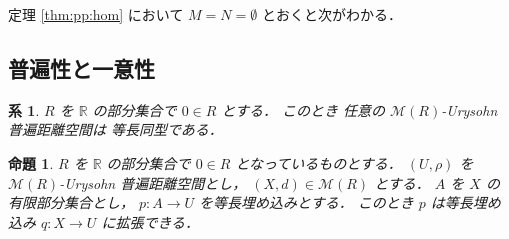 \documentclass[leqno, 12pt]{jsarticle}
\newtheorem{prop}[thm]{命題}
\newtheorem{cor}[thm]{系}
\newcommand{\rr}{\mathbb{R}}
\newcommand{\Met}[1]{\mathscr{M}(#1)}
\begin{document}
定理 \ref{thm:pp:hom}
において
$M=N=\emptyset$
とおくと次がわかる．
\subsection{普遍性と一意性}\label{subsec:uniqueness:universality}

\begin{cor}\label{cor:pp:doukeiury}
$R$
を
$\rr$
の部分集合で
$0\in R$
とする．%
このとき
任意の
$\Met{R}$-Urysohn
普遍距離空間は
等長同型である．
\end{cor}


\begin{prop}\label{prop:pp:universal}
$R$
を
$\rr$
の部分集合で
$0\in R$
となっているものとする．
$(U, \rho)$
を
$\Met{R}$-Urysohn
普遍距離空間とし，
$(X, d)\in \Met{R}$
とする．
$A$
を
$X$
の有限部分集合とし，
$p\colon  A\to U$
を等長埋め込みとする．
このとき
$p$
は等長埋め込み
$q\colon  X\to U$
に拡張できる．
\end{prop}
\end{document}
